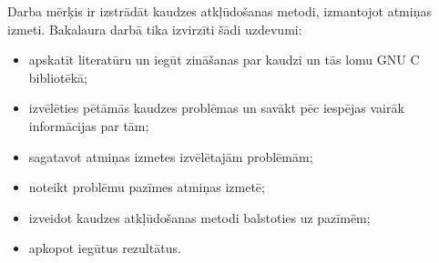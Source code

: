 ﻿
Darba mērķis ir izstrādāt kaudzes atkļūdošanas metodi, izmantojot atmiņas izmeti.
Bakalaura darbā tika izvirzīti šādi uzdevumi:
\begin{itemize}
	\item apskatīt literatūru un iegūt zināšanas par kaudzi un tās lomu GNU C bibliotēkā;
    \item izvēlēties pētāmās kaudzes problēmas un savākt pēc iespējas vairāk informācijas par tām;
    \item sagatavot atmiņas izmetes izvēlētajām problēmām;
    \item noteikt  problēmu pazīmes atmiņas izmetē;
    \item izveidot kaudzes atkļūdošanas metodi balstoties uz pazīmēm;
    \item apkopot iegūtus rezultātus.
\end{itemize} 